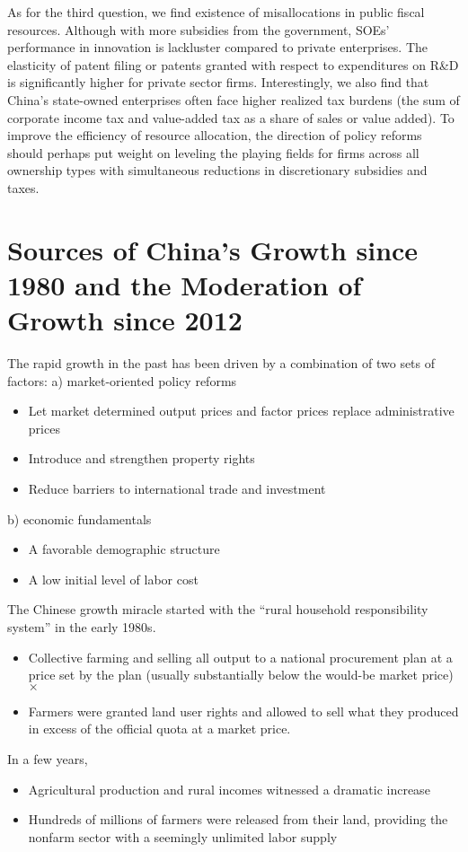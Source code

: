 \documentclass{article}
\begin{document}
    As for the third question, we find existence of misallocations in public fiscal resources. Although with more subsidies from the government, SOEs' performance in innovation is lackluster compared to private enterprises. The elasticity of patent filing or patents granted with respect to expenditures on R\&D is significantly higher for private sector firms. Interestingly, we also find that China’s state-owned enterprises often face higher realized tax burdens (the sum of corporate income tax and value-added tax as a share of sales or value added). To improve the efficiency of resource allocation, the direction of policy reforms should perhaps put weight on leveling the playing fields for firms across all ownership types with simultaneous reductions in discretionary subsidies and taxes.
    \section*{Sources of China’s Growth since 1980 and the Moderation of Growth since 2012}
    The rapid growth in the past has been driven by a combination of two sets of factors: a) market-oriented policy reforms
    \begin{itemize}
        \item Let market determined output prices and factor prices replace administrative prices
        \item Introduce and strengthen property rights
        \item Reduce barriers to international trade and investment
    \end{itemize}
    b) economic fundamentals
    \begin{itemize}
        \item A favorable demographic structure
        \item A low initial level of labor cost
    \end{itemize}

    The Chinese growth miracle started with the “rural household responsibility system” in the early 1980s.
    \begin{itemize}
        \item Collective farming and selling all output to a national procurement plan at a price set by the plan (usually substantially below the would-be market price) $\times$
        \item Farmers were granted land user rights and allowed to sell what they produced in excess of the official quota at a market price. \checkmark
    \end{itemize}
    In a few years,
    \begin{itemize}
        \item Agricultural production and rural incomes witnessed a dramatic increase
        \item Hundreds of millions of farmers were released from their land, providing the nonfarm sector with a seemingly unlimited labor supply
    \end{itemize}
\end{document}
